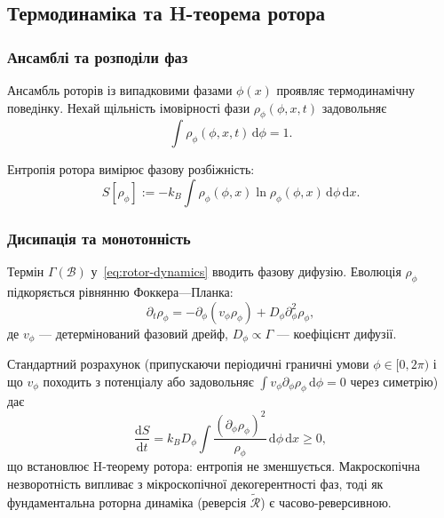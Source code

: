 \documentclass[11pt,a4paper]{article}
\newcommand{\rev}[1]{\widetilde{#1}}           %
\newcommand{\Rotor}{\mathcal{R}}
\newcommand{\Biv}{\mathcal{B}}
\theoremstyle{definition}
\theoremstyle{plain}
\theoremstyle{remark}
\begin{document}
\subsection{Термодинаміка та H-теорема ротора}

\subsubsection{Ансамблі та розподіли фаз}

Ансамбль роторів із випадковими фазами $\phi(x)$ проявляє термодинамічну поведінку. Нехай щільність імовірності фази $\rho_\phi(\phi,x,t)$ задовольняє
\begin{equation}
\int \rho_\phi(\phi,x,t)\, \mathrm{d}\phi = 1.
\end{equation}

Ентропія ротора вимірює фазову розбіжність:
\begin{equation}
S[\rho_\phi] := -k_B \int \rho_\phi(\phi,x) \ln \rho_\phi(\phi,x)\, \mathrm{d}\phi\, \mathrm{d}x.
\end{equation}

\subsubsection{Дисипація та монотонність}

Термін $\Gamma(\Biv)$ у~\eqref{eq:rotor-dynamics} вводить фазову дифузію. Еволюція $\rho_\phi$ підкоряється рівнянню Фоккера—Планка:
\begin{equation}
\partial_t \rho_\phi = -\partial_\phi\!\left(v_\phi \rho_\phi\right) + D_\phi \partial_\phi^2 \rho_\phi,
\end{equation}
де $v_\phi$ — детермінований фазовий дрейф, $D_\phi \propto \Gamma$ — коефіцієнт дифузії.

Стандартний розрахунок (припускаючи періодичні граничні умови $\phi \in [0, 2\pi)$ і що $v_\phi$ походить з потенціалу або задовольняє $\int v_\phi \partial_\phi \rho_\phi\, \mathrm{d}\phi = 0$ через симетрію) дає
\begin{equation}
\frac{\mathrm{d}S}{\mathrm{d}t} = k_B D_\phi \int \frac{(\partial_\phi \rho_\phi)^2}{\rho_\phi}\, \mathrm{d}\phi\, \mathrm{d}x \geq 0,
\end{equation}
що встановлює H-теорему ротора: ентропія не зменшується. Макроскопічна незворотність випливає з мікроскопічної декогерентності фаз, тоді як фундаментальна роторна динаміка (реверсія $\rev{\Rotor}$) є часово-реверсивною.

\vspace{1em}
\end{document}
